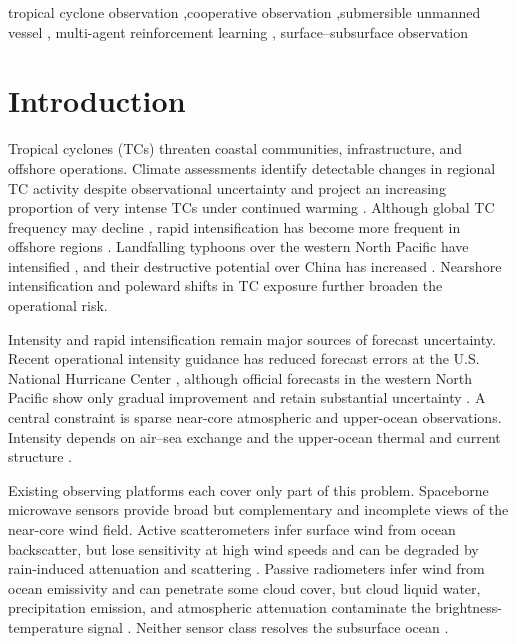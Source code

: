 \documentclass[a4paper,fleqn]{cas-dc}
\begin{document}
\begin{keywords}
tropical cyclone observation \sep cooperative observation \sep submersible unmanned vessel \sep
multi-agent reinforcement learning \sep
surface--subsurface observation
\end{keywords}

\maketitle

\section{Introduction}
Tropical cyclones (TCs) threaten coastal communities, infrastructure, and
offshore operations. Climate assessments identify detectable changes in
regional TC activity despite observational uncertainty \citep{r1} and project
an increasing proportion of very intense TCs under continued warming
\citep{r2}. Although global TC frequency may decline \citep{r3}, rapid
intensification has become more frequent in offshore regions \citep{r4}.
Landfalling typhoons over the western North Pacific have intensified
\citep{r5}, and their destructive potential over China has increased
\citep{r6}. Nearshore intensification \citep{r7} and poleward shifts in TC
exposure \citep{r8} further broaden the operational risk.

Intensity and rapid intensification remain major sources of forecast
uncertainty. Recent operational intensity guidance has reduced forecast errors
at the U.S. National Hurricane Center \citep{r9}, although official forecasts
in the western North Pacific show only gradual improvement and retain
substantial uncertainty \citep{r10}. A central constraint is sparse near-core
atmospheric and upper-ocean observations. Intensity depends on air--sea
exchange and the upper-ocean thermal and current structure \citep{r11,r12}.

Existing observing platforms each cover only part of this problem. Spaceborne
microwave sensors provide broad but complementary and incomplete views of the
near-core wind field. Active scatterometers infer surface wind from ocean
backscatter, but lose sensitivity at high wind speeds and can be degraded by
rain-induced attenuation and scattering \citep{r58}. Passive radiometers infer
wind from ocean emissivity and can penetrate some cloud cover, but cloud
liquid water, precipitation emission, and atmospheric attenuation contaminate
the brightness-temperature signal \citep{r58,r59}. Neither sensor class resolves
the subsurface ocean \citep{r13}.
\end{document}
